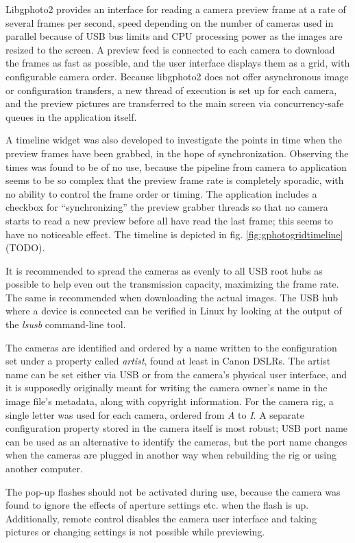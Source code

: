 Libgphoto2 provides an interface for reading a camera preview frame at a rate of several frames per second, speed depending on the number of cameras used in parallel because of USB bus limits and CPU processing power as the images are resized to the screen.
A preview feed is connected to each camera to download the frames as fast as possible, and the user interface displays them as a grid, with configurable camera order.
Because libgphoto2 does not offer asynchronous image or configuration transfers, a new thread of execution is set up for each camera, and the preview pictures are transferred to the main screen via concurrency-safe queues in the application itself.

A timeline widget was also developed to investigate the points in time when the preview frames have been grabbed, in the hope of synchronization.
Observing the times was found to be of no use, because the pipeline from camera to application seems to be so complex that the preview frame rate is completely sporadic, with no ability to control the frame order or timing.
The application includes a checkbox for ``synchronizing'' the preview grabber threads so that no camera starts to read a new preview before all have read the last frame; this seems to have no noticeable effect.
The timeline is depicted in fig. \ref{fig:gphotogridtimeline} (TODO).

It is recommended to spread the cameras as evenly to all USB root hubs as possible to help even out the transmission capacity, maximizing the frame rate.
The same is recommended when downloading the actual images.
The USB hub where a device is connected can be verified in Linux by looking at the output of the \emph{lsusb} command-line tool.

The cameras are identified and ordered by a name written to the configuration set under a property called \emph{artist}, found at least in Canon DSLRs.
The artist name can be set either via USB or from the camera's physical user interface, and it is supposedly originally meant for writing the camera owner's name in the image file's metadata, along with copyright information.
For the camera rig, a single letter was used for each camera, ordered from \emph{A} to \emph{I}.
A separate configuration property stored in the camera itself is most robust; USB port name can be used as an alternative to identify the cameras, but the port name changes when the cameras are plugged in another way when rebuilding the rig or using another computer.

The pop-up flashes should not be activated during use, because the camera was found to ignore the effects of aperture settings etc. when the flash is up.
Additionally, remote control disables the camera user interface and taking pictures or changing settings is not possible while previewing.

